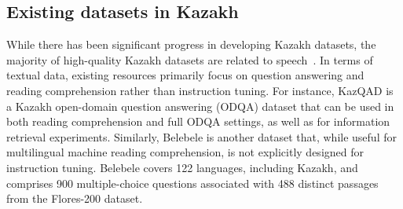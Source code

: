 
\subsection{Existing datasets in Kazakh}
While there has been significant progress in developing Kazakh datasets, the majority of high-quality Kazakh datasets are related to speech~\cite{kaz_asr, mussakhojayeva22_interspeech, mussakhojayeva21_interspeech}. In terms of textual data, existing resources primarily focus on question answering and reading comprehension rather than instruction tuning. For instance, KazQAD \cite{kazqad2024} is a Kazakh open-domain question answering (ODQA) dataset that can be used in both reading comprehension and full ODQA settings, as well as for information retrieval experiments. Similarly, Belebele \cite{bandarkar2023belebele} is another dataset that, while useful for multilingual machine reading comprehension, is not explicitly designed for instruction tuning. Belebele covers 122 languages, including Kazakh, and comprises 900 multiple-choice questions associated with 488 distinct passages from the Flores-200 dataset. 



